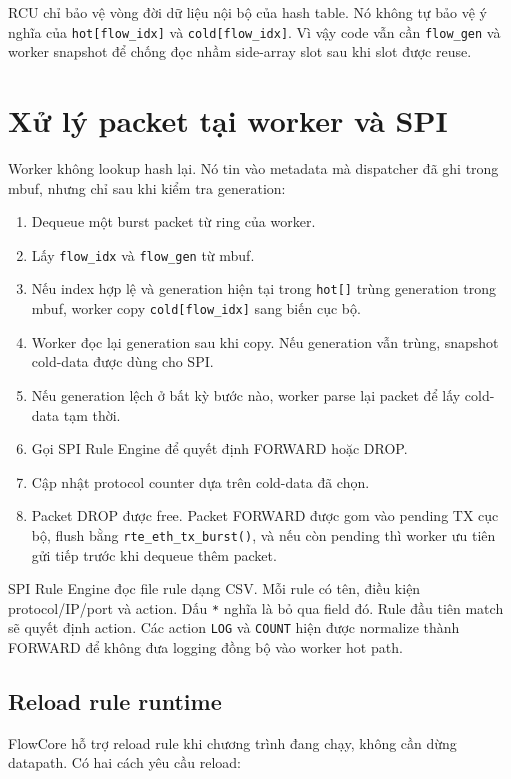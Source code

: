 \documentclass[12pt,a4paper]{report}
\DeclareRobustCommand{\code}[1]{{\small\texttt{#1}}}
\begin{document}
RCU chỉ bảo vệ vòng đời dữ liệu nội bộ của hash table. Nó không tự bảo vệ ý nghĩa của \code{hot[flow\_idx]} và \code{cold[flow\_idx]}. Vì vậy code vẫn cần \code{flow\_gen} và worker snapshot để chống đọc nhầm side-array slot sau khi slot được reuse.

\section{Xử lý packet tại worker và SPI}

Worker không lookup hash lại. Nó tin vào metadata mà dispatcher đã ghi trong mbuf, nhưng chỉ sau khi kiểm tra generation:

\begin{enumerate}
    \item Dequeue một burst packet từ ring của worker.
    \item Lấy \code{flow\_idx} và \code{flow\_gen} từ mbuf.
    \item Nếu index hợp lệ và generation hiện tại trong \code{hot[]} trùng generation trong mbuf, worker copy \code{cold[flow\_idx]} sang biến cục bộ.
    \item Worker đọc lại generation sau khi copy. Nếu generation vẫn trùng, snapshot cold-data được dùng cho SPI.
    \item Nếu generation lệch ở bất kỳ bước nào, worker parse lại packet để lấy cold-data tạm thời.
    \item Gọi SPI Rule Engine để quyết định FORWARD hoặc DROP.
    \item Cập nhật protocol counter dựa trên cold-data đã chọn.
    \item Packet DROP được free. Packet FORWARD được gom vào pending TX cục bộ, flush bằng \code{rte\_eth\_tx\_burst()}, và nếu còn pending thì worker ưu tiên gửi tiếp trước khi dequeue thêm packet.
\end{enumerate}

SPI Rule Engine đọc file rule dạng CSV. Mỗi rule có tên, điều kiện protocol/IP/port và action. Dấu \code{*} nghĩa là bỏ qua field đó. Rule đầu tiên match sẽ quyết định action. Các action \code{LOG} và \code{COUNT} hiện được normalize thành FORWARD để không đưa logging đồng bộ vào worker hot path.

\subsection{Reload rule runtime}

FlowCore hỗ trợ reload rule khi chương trình đang chạy, không cần dừng datapath. Có hai cách yêu cầu reload:
\end{document}
